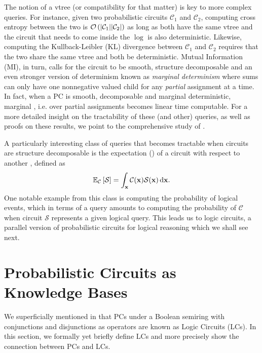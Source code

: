 The notion of a vtree (or compatibility for that matter) is key to more complex queries. For
instance, given two probabilistic circuits $\mathcal{C}_1$ and $\mathcal{C}_2$, computing cross
entropy between the two is $\mathcal{O}\left(|\mathcal{C}_1||\mathcal{C}_2|\right)$ as long as both have
the same vtree and the circuit that needs to come inside the $\log$ is also deterministic.
Likewise, computing the Kullback-Leibler (KL) divergence between $\mathcal{C}_1$ and
$\mathcal{C}_2$ requires that the two share the same vtree and both be deterministic. Mutual
Information (MI), in turn, calls for the circuit to be smooth, structure decomposable and an even
stronger version of determinism known as \emph{marginal determinism} where sums can only have one
nonnegative valued child for any \emph{partial} assignment at a time. In fact, when a PC is smooth,
decomposable and marginal deterministic, marginal \map{}, i.e. \map{} over partial assignments
becomes linear time computable. For a more detailed insight on the tractability of these (and
other) queries, as well as proofs on these results, we point to the comprehensive study of
\citet{vergari21}.

A particularly interesting class of queries that becomes tractable when circuits are structure
decomposable is the expectation (\expc{}) of a circuit with respect to another \citep{choi20},
defined as
\begin{equation}
  \mathbb{E}_\mathcal{C}\left[\mathcal{S}\right]=\int_{\mathbf{x}}\mathcal{C}(\mathbf{x})\mathcal{S}(\mathbf{x})\mathop{}\!\mathrm{d}\mathbf{x}.
  \label{eq:exp}
\end{equation}
One notable example from this class is computing the probability of logical events, which in terms
of a \expc{} query amounts to computing the probability of $\mathcal{C}$ when circuit $\mathcal{S}$
represents a given logical query. This leads us to logic circuits, a parallel version of
probabilistic circuits for logical reasoning which we shall see next.

\section{Probabilistic Circuits as Knowledge Bases}
\label{sec:pckb}

We superficially mentioned in  that PCs under a Boolean semiring with
conjunctions and disjunctions as operators are known as Logic Circuits (LCs). In this section, we
formally yet briefly define LCs and more precisely show the connection between PCs and LCs.

